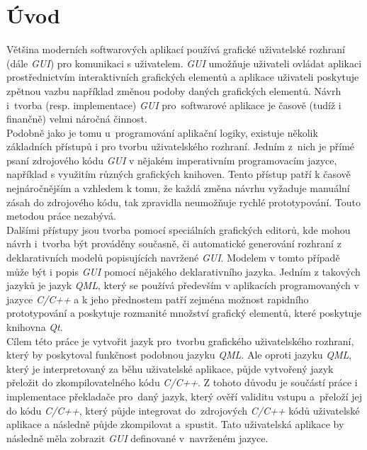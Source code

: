 \documentclass[11pt,twoside,a4paper]{book}
\begin{document}
\chapter{\label{CH:Intro}Úvod}
Většina moderních softwarových aplikací používá grafické uživatelské rozhraní (dále \textit{GUI}) pro komunikaci s uživatelem. \textit{GUI} umožňuje uživateli ovládat aplikaci prostřednictvím interaktivních grafických elementů a aplikace uživateli poskytuje zpětnou vazbu například změnou podoby daných grafických elementů. Návrh i~tvorba (resp. implementace) \textit{GUI} pro~softwarové aplikace je časově (tudíž i finančně) velmi náročná činnost. \\
Podobně jako je tomu u~programování aplikační logiky, existuje několik základních přístupů i pro tvorbu uživatelského rozhraní. Jedním z~nich je přímé psaní zdrojového kódu \textit{GUI} v nějakém imperativním programovacím jazyce, například s využitím různých grafických knihoven. Tento přístup patří k časově nejnáročnějším a vzhledem k tomu, že každá změna návrhu vyžaduje manuální zásah do zdrojového kódu, tak zpravidla neumožňuje rychlé prototypování. Touto metodou práce nezabývá.\\
Dalšími přístupy jsou tvorba pomocí speciálních grafických editorů, kde mohou návrh i~tvorba být prováděny současně, či automatické generování rozhraní z deklarativních modelů popisujících navržené \textit{GUI}. Modelem v tomto případě může být i popis \textit{GUI} pomocí nějakého deklarativního jazyka. Jedním z takových jazyků je jazyk \textit{QML}, který se používá především v aplikacích programovaných v jazyce \textit{C/C++} a k jeho přednostem patří zejména možnost rapidního prototypování a poskytuje rozmanité množství grafický elementů, které poskytuje knihovna \textit{Qt}.\\
Cílem této práce je vytvořit jazyk pro~tvorbu grafického uživatelského rozhraní, který by poskytoval funkčnost podobnou jazyku \textit{QML}. Ale oproti jazyku \textit{QML}, který je interpretovaný za běhu uživatelské aplikace, půjde vytvořený jazyk přeložit do zkompilovatelného kódu \textit{C/C++}. Z tohoto důvodu je součástí práce i implementace překladače pro~daný jazyk, který ověří validitu vstupu a~přeloží jej do kódu \textit{C/C++}, který půjde integrovat do~zdrojových \textit{C/C++} kódů uživatelské aplikace a následně půjde zkompilovat a~spustit. Tato uživatelská aplikace by následně měla zobrazit \textit{GUI} definované v~navrženém jazyce.\\
\end{document}
